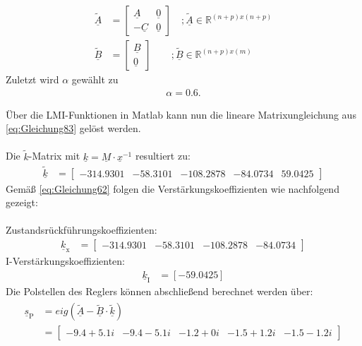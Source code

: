 \begin{align*}
    \underline{\tilde{A}} &= 
    \begin{bmatrix}
        \underline{A} & \underline{0} \\
        -\underline{C} & \underline{0}
    \end{bmatrix} \quad ; \underline{\tilde{A}}\in\mathbb{R}^{(n+p)x(n+p)}\\
    \underline{\tilde{B}} &= 
    \begin{bmatrix}
        \underline{B} \\
        \underline{0}
    \end{bmatrix}\qquad ; \underline{\tilde{B}}\in\mathbb{R}^{(n+p)x(m)}
\end{align*}
\newline
Zuletzt wird $\alpha$ gewählt zu
\begin{align*}
    \alpha = 0.6.
\end{align*}
\newline

Über die LMI-Funktionen in Matlab kann nun die lineare Matrixungleichung aus \autoref{eq:Gleichung83} gelöst werden.\\\\
Die $\tilde{k}$-Matrix mit $\underline{k} = \underline{M}\cdot\underline{x}^{-1}$ resultiert zu:
\begin{align}
    \underline{\tilde{k}} &= 
    \begin{bmatrix}
        -314.9301 & -58.3101 & -108.2878 & -84.0734 & 59.0425
    \end{bmatrix}
\end{align}
\newline
Gemäß \autoref{eq:Gleichung62} folgen die Verstärkungskoeffizienten wie nachfolgend gezeigt:\\\\
Zustandsrückführungskoeffizienten:
\begin{align}
    \underline{k}_{\mathrm{x}} &= 
    \begin{bmatrix}
        -314.9301 & -58.3101 & -108.2878 & -84.0734
    \end{bmatrix}
\end{align}
\newline
I-Verstärkungskoeffizienten:
\begin{align}
    \underline{k}_{\mathrm{I}} &= [-59.0425]
\end{align}
\newline
Die Polstellen des Reglers können abschließend berechnet werden über:
\begin{align}
    \begin{split}
        \underline{s}_{\mathrm{P}} &= eig(\underline{\tilde{A}} - \underline{\tilde{B}}\cdot\underline{\tilde{k}}) \\&=
        \begin{bmatrix}
            -9.4 + 5.1i & -9.4 - 5.1i & -1.2 + 0i & -1.5 + 1.2i & -1.5 - 1.2i
        \end{bmatrix}
    \end{split}
\end{align}

